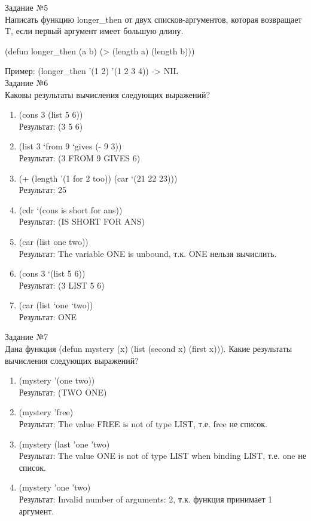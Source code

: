 \vspace*{10mm}
{\LARGE Задание №5}\\

Написать функцию longer\_then от двух списков-аргументов, которая возвращает T, если первый аргумент имеет большую длину.

(defun longer\_then (a b) (> (length a) (length b)))

Пример: (longer\_then '(1 2) '(1 2 3 4)) -> NIL\\

{\LARGE Задание №6}\\

Каковы результаты вычисления следующих выражений?

\begin{enumerate}
\item (cons 3 (list 5 6))\\
Результат: (3 5 6)
\item (list 3 ‘from 9 ‘gives (- 9 3))\\
Результат: (3 FROM 9 GIVES 6)
\item (+ (length '(1 for 2 too)) (car ‘(21 22 23)))\\
Результат: 25
\item (cdr ‘(cons is short for ans))\\
Результат: (IS SHORT FOR ANS)
\item (car (list one two))\\
Результат: The variable ONE is unbound, т.к. ONE  нельзя вычислить.
\item (cons 3 ‘(list 5 6))\\
Результат: (3 LIST 5 6)
\item (car (list ‘one ‘two))\\
Результат: ONE\\
\end{enumerate}

\vspace*{10mm}
{\LARGE Задание №7}\\

Дана функция (defun mystery (x) (list (second x) (first x))). Какие результаты вычисления следующих выражений?

\begin{enumerate}
\item (mystery '(one two))\\
Результат: (TWO ONE)
\item (mystery 'free)\\
Результат: The value FREE is not of type LIST, т.е. free не список.
\item (mystery (last 'one 'two)\\
Результат: The value ONE is not of type LIST when binding LIST, т.е. one не список.
\item (mystery 'one 'two)\\
Результат: Invalid number of arguments: 2, т.к. функция принимает 1 аргумент.
\end{enumerate}



